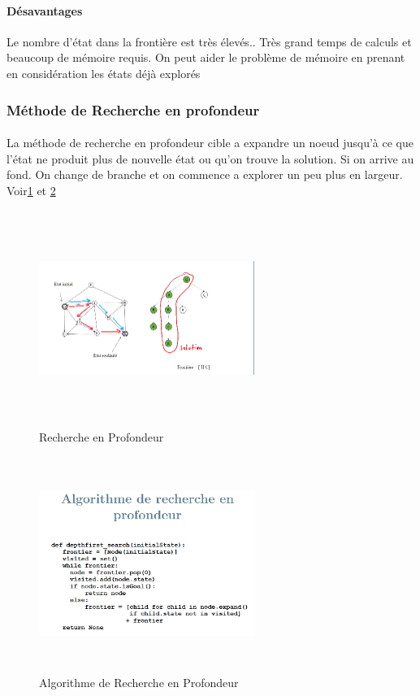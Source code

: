 \documentclass[oneside]{book}
\begin{document}
\paragraph{Désavantages}
Le nombre d'état dans la frontière est très élevés.. Très grand temps de calculs et beaucoup de mémoire requis. On peut aider le problème de mémoire en prenant en considération les états déjà explorés

\subsubsection{Méthode de Recherche en profondeur}
\paragraph{}
La méthode de recherche en profondeur cible a expandre un noeud jusqu'à ce que l'état ne produit plus de nouvelle état ou qu'on trouve la solution. Si on arrive au fond. On change de branche et on commence a explorer un peu plus en largeur. Voir\ref{fig:Recherche_en_profondeur} et \ref{fig:Algo_Recherche_en_profondeur}

\begin{figure}[!ht]
\centering
\includegraphics[width = 7cm, height = 7cm, keepaspectratio]{Recherche_Profondeur.png}
\caption{Recherche en Profondeur}
\label{fig:Recherche_en_profondeur}
\end{figure}

\begin{figure}[!ht]
\centering
\includegraphics[width = 7cm, height = 7cm, keepaspectratio]{algo_profondeur.png}
\caption{Algorithme de Recherche en Profondeur}
\label{fig:Algo_Recherche_en_profondeur}
\end{figure}
\end{document}
